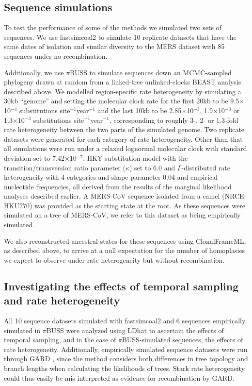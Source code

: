 \documentclass[11pt,oneside,letterpaper]{article}
\begin{document}
\subsection*{Sequence simulations}
To test the performance of some of the methods we simulated two sets of sequences.
We use fastsimcoal2 \citep{excoffier_2013} to simulate 10 replicate datasets that have the same dates of isolation and similar diversity to the MERS dataset with 85 sequences under no recombination.

Additionally, we use $\pi$BUSS \citep{bielejec_2014} to simulate sequences down an MCMC-sampled phylogeny drawn at random from a linked-tree unlinked-clocks BEAST analysis described above.
We modelled region-specific rate heterogeneity by simulating a 30kb ``genome'' and setting the molecular clock rate for the first 20kb to be 9.5$\times$10$^{-4}$ substitutions site$^{-1}$year$^{-1}$ and the last 10kb to be 2.85$\times$10$^{-3}$, 1.9$\times$10$^{-3}$ or 1.3$\times$10$^{-3}$ substitutions site$^{-1}$year$^{-1}$, corresponding to roughly 3-, 2- or 1.3-fold rate heterogeneity between the two parts of the simulated genome.
Two replicate datasets were generated for each category of rate heterogeneity.
Other than that all simulations were run under a relaxed lognormal molecular clock \citep{drummond_2006} with standard deviation set to 7.42$\times$10$^{-7}$, HKY substitution model \citep{hky_1985} with the transition/transversion ratio parameter ($\kappa$) set to 6.0 and $\Gamma$-distributed rate heterogeneity with 4 categories and shape parameter 0.04 and empirical nucleotide frequencies, all derived from the results of the marginal likelihood analyses described earlier.
A MERS-CoV sequence isolated from a camel (NRCE-HKU270) was provided as the starting state at the root.
As these sequences were simulated on a tree of MERS-CoV, we refer to this dataset as being empirically simulated.

We also reconstructed ancestral states for these sequences using ClonalFrameML, as described above, to arrive at a null expectation for the number of homoplasies we expect to observe under rate heterogeneity but without recombination.

\subsection*{Investigating the effects of temporal sampling and rate heterogeneity}
All 10 sequence datasets simulated with fastsimcoal2 and 6 sequences empirically simulated in $\pi$BUSS were analyzed using LDhat \citep{mcvean_2002} to ascertain the effects of temporal sampling, and in the case of $\pi$BUSS-simulated sequences, the effects of rate heterogeneity.
Additionally, empirically simulated sequence datasets were run through GARD \citep{pond_2006}, since the method considers both differences in tree topology and branch lengths when calculating the likelihoods of trees.
Stark rate heterogeneity could thus easily be mis-interpreted as evidence for recombination by GARD.
\end{document}
